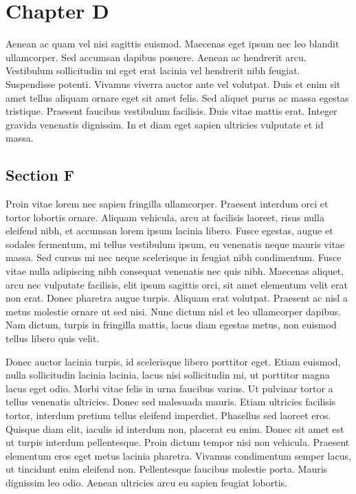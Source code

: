 \chapter{Chapter D}
Aenean ac quam vel nisi sagittis euismod. Maecenas eget ipsum nec leo blandit ullamcorper. Sed accumsan dapibus posuere. Aenean ac hendrerit arcu. Vestibulum sollicitudin mi eget erat lacinia vel hendrerit nibh feugiat. Suspendisse potenti. Vivamus viverra auctor ante vel volutpat. Duis et enim sit amet tellus aliquam ornare eget sit amet felis. Sed aliquet purus ac massa egestas tristique. Praesent faucibus vestibulum facilisis. Duis vitae mattis erat. Integer gravida venenatis dignissim. In et diam eget sapien ultricies vulputate et id massa.

\section{Section F}
Proin vitae lorem nec sapien fringilla ullamcorper. Praesent interdum orci et tortor lobortis ornare. Aliquam vehicula, arcu at facilisis laoreet, risus nulla eleifend nibh, et accumsan lorem ipsum lacinia libero. Fusce egestas, augue et sodales fermentum, mi tellus vestibulum ipsum, eu venenatis neque mauris vitae massa. Sed cursus mi nec neque scelerisque in feugiat nibh condimentum. Fusce vitae nulla adipiscing nibh consequat venenatis nec quis nibh. Maecenas aliquet, arcu nec vulputate facilisis, elit ipsum sagittis orci, sit amet elementum velit erat non erat. Donec pharetra augue turpis. Aliquam erat volutpat. Praesent ac nisl a metus molestie ornare ut sed nisi. Nunc dictum nisl et leo ullamcorper dapibus. Nam dictum, turpis in fringilla mattis, lacus diam egestas metus, non euismod tellus libero quis velit.

Donec auctor lacinia turpis, id scelerisque libero porttitor eget. Etiam euismod, nulla sollicitudin lacinia lacinia, lacus nisi sollicitudin mi, ut porttitor magna lacus eget odio. Morbi vitae felis in urna faucibus varius. Ut pulvinar tortor a tellus venenatis ultricies. Donec sed malesuada mauris. Etiam ultricies facilisis tortor, interdum pretium tellus eleifend imperdiet. Phasellus sed laoreet eros. Quisque diam elit, iaculis id interdum non, placerat eu enim. Donec sit amet est ut turpis interdum pellentesque. Proin dictum tempor nisi non vehicula. Praesent elementum eros eget metus lacinia pharetra. Vivamus condimentum semper lacus, ut tincidunt enim eleifend non. Pellentesque faucibus molestie porta. Mauris dignissim leo odio. Aenean ultricies arcu eu sapien feugiat lobortis.

